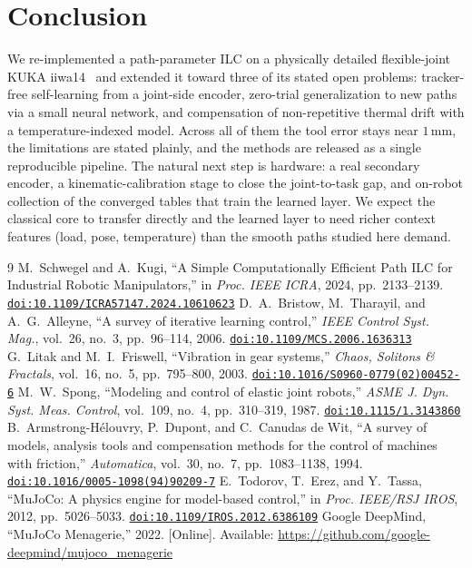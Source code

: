 \documentclass[10pt,twocolumn]{article}
\begin{document}
\section{Conclusion}
We re-implemented a path-parameter ILC on a physically detailed flexible-joint
KUKA iiwa14~\cite{spong1987} and extended it toward three of its stated open
problems: tracker-free self-learning from a joint-side encoder, zero-trial
generalization to new paths via a small neural network, and compensation of
non-repetitive thermal drift with a temperature-indexed model. Across all of them
the tool error stays near $1$\,mm, the limitations are stated plainly, and the
methods are released as a single reproducible pipeline. The natural next step is
hardware: a real secondary encoder, a kinematic-calibration stage to close the
joint-to-task gap, and on-robot collection of the converged tables that train the
learned layer. We expect the classical core to transfer directly and the learned
layer to need richer context features (load, pose, temperature) than the smooth
paths studied here demand.

\FloatBarrier
\begin{thebibliography}{9}\small
{} M.~Schwegel and A.~Kugi, ``A Simple Computationally
Efficient Path ILC for Industrial Robotic Manipulators,'' in \emph{Proc. IEEE
ICRA}, 2024, pp.~2133--2139.
\href{https://doi.org/10.1109/ICRA57147.2024.10610623}{\texttt{doi:10.1109/ICRA57147.2024.10610623}}
 D.~A.~Bristow, M.~Tharayil, and A.~G.~Alleyne, ``A survey of
iterative learning control,'' \emph{IEEE Control Syst. Mag.}, vol.~26, no.~3,
pp.~96--114, 2006.
\href{https://doi.org/10.1109/MCS.2006.1636313}{\texttt{doi:10.1109/MCS.2006.1636313}}
 G.~Litak and M.~I.~Friswell, ``Vibration in gear systems,''
\emph{Chaos, Solitons \& Fractals}, vol.~16, no.~5, pp.~795--800, 2003.
\href{https://doi.org/10.1016/S0960-0779(02)00452-6}{\texttt{doi:10.1016/S0960-0779(02)00452-6}}
 M.~W.~Spong, ``Modeling and control of elastic joint robots,''
\emph{ASME J. Dyn. Syst. Meas. Control}, vol.~109, no.~4, pp.~310--319, 1987.
\href{https://doi.org/10.1115/1.3143860}{\texttt{doi:10.1115/1.3143860}}
 B.~Armstrong-H\'elouvry, P.~Dupont, and C.~Canudas de Wit,
``A survey of models, analysis tools and compensation methods for the control of
machines with friction,'' \emph{Automatica}, vol.~30, no.~7, pp.~1083--1138, 1994.
\href{https://doi.org/10.1016/0005-1098(94)90209-7}{\texttt{doi:10.1016/0005-1098(94)90209-7}}
 E.~Todorov, T.~Erez, and Y.~Tassa, ``MuJoCo: A physics engine for
model-based control,'' in \emph{Proc. IEEE/RSJ IROS}, 2012, pp.~5026--5033.
\href{https://doi.org/10.1109/IROS.2012.6386109}{\texttt{doi:10.1109/IROS.2012.6386109}}
 Google DeepMind, ``MuJoCo Menagerie,'' 2022. [Online].
Available: \url{https://github.com/google-deepmind/mujoco_menagerie}
\end{thebibliography}
\end{document}
